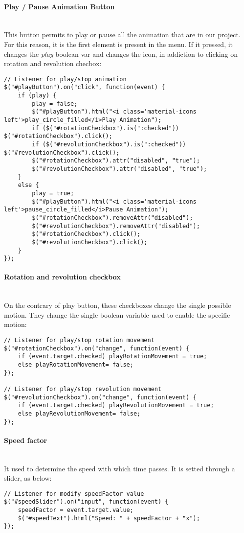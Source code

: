 \documentclass{article}
\begin{document}
\paragraph{Play / Pause Animation Button} \mbox{}\\
This button permits to play or pause all the animation that are in our project. For this reason, it is the first element is present in the menu. If it pressed, it changes the \textit{play} boolean var and changes the icon, in addiction to clicking on rotation and revolution checbox: 
\begin{lstlisting}
// Listener for play/stop animation
$("#playButton").on("click", function(event) {
	if (play) {
		play = false;
		$("#playButton").html("<i class='material-icons left'>play_circle_filled</i>Play Animation");
		if ($("#rotationCheckbox").is(":checked")) $("#rotationCheckbox").click();
		if ($("#revolutionCheckbox").is(":checked")) $("#revolutionCheckbox").click();
		$("#rotationCheckbox").attr("disabled", "true");
		$("#revolutionCheckbox").attr("disabled", "true");
	}
	else {
		play = true;
		$("#playButton").html("<i class='material-icons left'>pause_circle_filled</i>Pause Animation");
		$("#rotationCheckbox").removeAttr("disabled");
		$("#revolutionCheckbox").removeAttr("disabled");
		$("#rotationCheckbox").click();
		$("#revolutionCheckbox").click();
	}
});
\end{lstlisting}
\paragraph{Rotation and revolution checkbox}\mbox{}\\
On the contrary of play button, these checkboxes change the single possible motion. They change the single boolean variable used to enable the specific motion:
\begin{lstlisting} 
// Listener for play/stop rotation movement
$("#rotationCheckbox").on("change", function(event) {
	if (event.target.checked) playRotationMovement = true;
	else playRotationMovement= false;
});

// Listener for play/stop revolution movement
$("#revolutionCheckbox").on("change", function(event) {
	if (event.target.checked) playRevolutionMovement = true;
	else playRevolutionMovement= false;
});
\end{lstlisting}
\paragraph{Speed factor}\mbox{}\\
It used to determine the speed with which time passes. It is setted through a slider, as below:
\begin{lstlisting} 
// Listener for modify speedFactor value
$("#speedSlider").on("input", function(event) {
	speedFactor = event.target.value;
	$("#speedText").html("Speed: " + speedFactor + "x");
});
\end{lstlisting}
\end{document}
